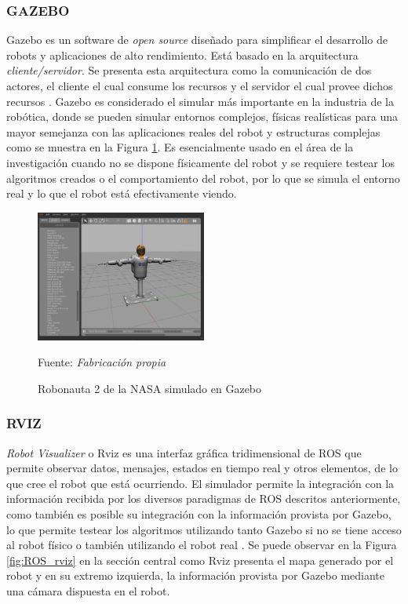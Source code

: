 \subsubsection{GAZEBO}
Gazebo es un  software de \textit{open source} diseñado para simplificar el desarrollo de robots y aplicaciones de alto rendimiento. Está basado en la arquitectura \textit{cliente/servidor}. Se presenta esta arquitectura como la comunicación de dos actores, el cliente el cual consume los recursos y el servidor el cual provee dichos recursos \cite{lizama_redes_nodate}. Gazebo es considerado el simular más importante en la industria de la robótica, donde se pueden simular entornos complejos, físicas realísticas para una mayor semejanza con las aplicaciones reales del robot y estructuras complejas como se muestra en la Figura \ref{fig:ROS_gazebo}. Es esencialmente usado en el área de la investigación cuando no se dispone físicamente del robot y se requiere testear los algoritmos creados o el comportamiento del robot, por lo que se simula el entorno real y lo que el robot está efectivamente viendo.


\begin{figure}[h]
    \centering
    \includegraphics[width=0.5\textwidth]{figures/02marco_conceptual/Gazebo.PNG}
    \caption{\label{fig:ROS_gazebo} Robonauta 2 de la NASA simulado en Gazebo} 
    Fuente: \textit{Fabricación propia}
    \end{figure}

\subsubsection{RVIZ}
\textit{Robot Visualizer} o Rviz es una interfaz gráfica tridimensional de ROS que permite observar datos, mensajes, estados en tiempo real y otros elementos, de lo que cree el robot que está ocurriendo. El simulador permite la integración con la información recibida por los diversos paradigmas de ROS descritos anteriormente, como también es posible su integración con la información provista por Gazebo, lo que permite testear los algoritmos utilizando tanto Gazebo si no se tiene acceso al robot físico o también utilizando el robot real \cite{kam_rviz_2015}. Se puede observar en la Figura \ref{fig:ROS_rviz} en la sección central como Rviz presenta el mapa generado por el robot y en su extremo izquierda, la información provista por Gazebo mediante una cámara dispuesta en el robot.

